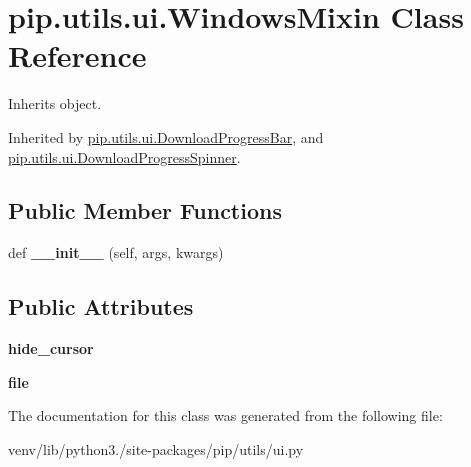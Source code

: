 \hypertarget{classpip_1_1utils_1_1ui_1_1_windows_mixin}{}\section{pip.\+utils.\+ui.\+Windows\+Mixin Class Reference}
\label{classpip_1_1utils_1_1ui_1_1_windows_mixin}


Inherits object.



Inherited by \hyperlink{classpip_1_1utils_1_1ui_1_1_download_progress_bar}{pip.\+utils.\+ui.\+Download\+Progress\+Bar}, and \hyperlink{classpip_1_1utils_1_1ui_1_1_download_progress_spinner}{pip.\+utils.\+ui.\+Download\+Progress\+Spinner}.

\subsection*{Public Member Functions}
\begin{DoxyCompactItemize}
\item 
\mbox{\label{classpip_1_1utils_1_1ui_1_1_windows_mixin_aec2911de911c450bf8761a767f306327}} 
def {\bfseries \+\_\+\+\_\+init\+\_\+\+\_\+} (self, args, kwargs)
\end{DoxyCompactItemize}
\subsection*{Public Attributes}
\begin{DoxyCompactItemize}
\item 
\mbox{\label{classpip_1_1utils_1_1ui_1_1_windows_mixin_a2569811f841a76234bdbe805eb1e1d3d}} 
{\bfseries hide\+\_\+cursor}
\item 
\mbox{\label{classpip_1_1utils_1_1ui_1_1_windows_mixin_a5575a2ea9388e04a6f158b9bb3408a38}} 
{\bfseries file}
\end{DoxyCompactItemize}


The documentation for this class was generated from the following file\+:\begin{DoxyCompactItemize}
\item 
venv/lib/python3./site-\/packages/pip/utils/ui.\+py\end{DoxyCompactItemize}
